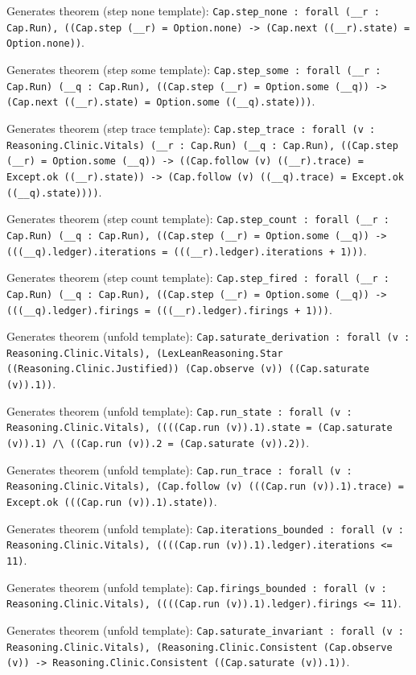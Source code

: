 \documentclass[11pt]{article}
\begin{document}
\noindent Generates theorem (step none template): \texttt{Cap.step\_none : forall (\_\_r : Cap.Run), ((Cap.step (\_\_r) = Option.none) -> (Cap.next ((\_\_r).state) = Option.none))}.\par
\noindent Generates theorem (step some template): \texttt{Cap.step\_some : forall (\_\_r : Cap.Run) (\_\_q : Cap.Run), ((Cap.step (\_\_r) = Option.some (\_\_q)) -> (Cap.next ((\_\_r).state) = Option.some ((\_\_q).state)))}.\par
\noindent Generates theorem (step trace template): \texttt{Cap.step\_trace : forall (v : Reasoning.Clinic.Vitals) (\_\_r : Cap.Run) (\_\_q : Cap.Run), ((Cap.step (\_\_r) = Option.some (\_\_q)) -> ((Cap.follow (v) ((\_\_r).trace) = Except.ok ((\_\_r).state)) -> (Cap.follow (v) ((\_\_q).trace) = Except.ok ((\_\_q).state))))}.\par
\noindent Generates theorem (step count template): \texttt{Cap.step\_count : forall (\_\_r : Cap.Run) (\_\_q : Cap.Run), ((Cap.step (\_\_r) = Option.some (\_\_q)) -> (((\_\_q).ledger).iterations = (((\_\_r).ledger).iterations + 1)))}.\par
\noindent Generates theorem (step count template): \texttt{Cap.step\_fired : forall (\_\_r : Cap.Run) (\_\_q : Cap.Run), ((Cap.step (\_\_r) = Option.some (\_\_q)) -> (((\_\_q).ledger).firings = (((\_\_r).ledger).firings + 1)))}.\par
\noindent Generates theorem (unfold template): \texttt{Cap.saturate\_derivation : forall (v : Reasoning.Clinic.Vitals), (LexLeanReasoning.Star ((Reasoning.Clinic.Justified)) (Cap.observe (v)) ((Cap.saturate (v)).1))}.\par
\noindent Generates theorem (unfold template): \texttt{Cap.run\_state : forall (v : Reasoning.Clinic.Vitals), ((((Cap.run (v)).1).state = (Cap.saturate (v)).1) /\textbackslash{} ((Cap.run (v)).2 = (Cap.saturate (v)).2))}.\par
\noindent Generates theorem (unfold template): \texttt{Cap.run\_trace : forall (v : Reasoning.Clinic.Vitals), (Cap.follow (v) (((Cap.run (v)).1).trace) = Except.ok (((Cap.run (v)).1).state))}.\par
\noindent Generates theorem (unfold template): \texttt{Cap.iterations\_bounded : forall (v : Reasoning.Clinic.Vitals), ((((Cap.run (v)).1).ledger).iterations <= 11)}.\par
\noindent Generates theorem (unfold template): \texttt{Cap.firings\_bounded : forall (v : Reasoning.Clinic.Vitals), ((((Cap.run (v)).1).ledger).firings <= 11)}.\par
\noindent Generates theorem (unfold template): \texttt{Cap.saturate\_invariant : forall (v : Reasoning.Clinic.Vitals), (Reasoning.Clinic.Consistent (Cap.observe (v)) -> Reasoning.Clinic.Consistent ((Cap.saturate (v)).1))}.\par
\end{document}
